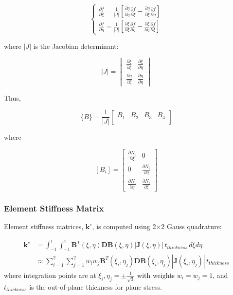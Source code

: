 \documentclass{article}
\begin{document}
\[
  \begin{cases}
    \frac{\partial f}{\partial \xi} = \frac{1}{|J|}\left[\frac{\partial \eta}{\partial \eta} \frac{\partial f}{\partial \xi} - \frac{\partial \eta}{\partial \xi} \frac{\partial f}{\partial \eta}\right] \\
    \frac{\partial f}{\partial \eta} = \frac{1}{|J|}\left[\frac{\partial \xi}{\partial \xi} \frac{\partial f}{\partial \eta} - \frac{\partial \xi}{\partial \eta} \frac{\partial f}{\partial \xi}\right]
  \end{cases}
\]

where \( |J| \) is the Jacobian determinant:

\[
  |J| = \begin{vmatrix}
    \frac{\partial \xi}{\partial \xi}  & \frac{\partial \xi}{\partial \eta}  \\
    \frac{\partial \eta}{\partial \xi} & \frac{\partial \eta}{\partial \eta}
  \end{vmatrix}
\]

Thus,

\[
  \{B\} = \frac{1}{|J|}
  \begin{bmatrix}
    B_1 & B_2 & B_3 & B_4 \\
  \end{bmatrix}
\]

where

\[
  [B_i] = \begin{bmatrix}
    \frac{\partial N_i}{\partial \xi}  & 0                                  \\
    0                                  & \frac{\partial N_i}{\partial \eta} \\
    \frac{\partial N_i}{\partial \eta} & \frac{\partial N_i}{\partial \xi}
  \end{bmatrix}
\]

\subsubsection{Element Stiffness Matrix}

Element stiffness matrices, $\mathbf{k}^e$, is computed using 2$\times$2 Gauss quadrature:

\begin{align*}
  \mathbf{k}^e & = \int_{-1}^{1}\int_{-1}^{1} \mathbf{B}^T(\xi,\eta)\mathbf{D}\mathbf{B}(\xi,\eta)|\mathbf{J}(\xi,\eta)| \, t_{thickness} \, d\xi d\eta             \\
               & \approx \sum_{i=1}^{2}\sum_{j=1}^{2} w_iw_j\mathbf{B}^T(\xi_i,\eta_j)\mathbf{D}\mathbf{B}(\xi_i,\eta_j)|\mathbf{J}(\xi_i,\eta_j)| \, t_{thickness}
\end{align*}
where integration points are at $\xi_i,\eta_j = \pm\frac{1}{\sqrt{3}}$ with weights $w_i=w_j=1$, and $t_{thickness}$ is the out-of-plane thickness for plane stress.
\end{document}
